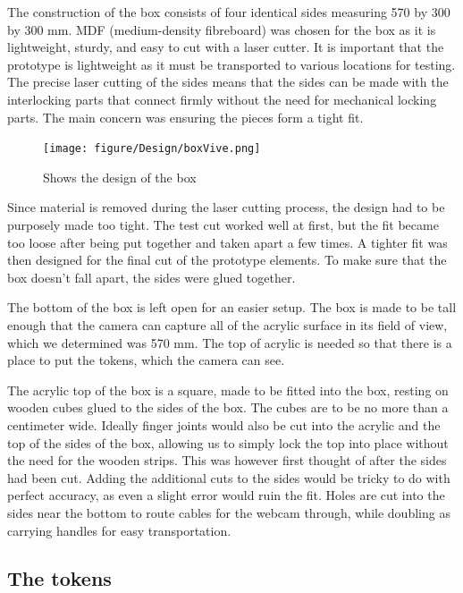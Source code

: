 The construction of the box consists of four identical sides measuring 570 by 300 by 300 mm. MDF (medium-density fibreboard) was chosen for the box as it is lightweight, sturdy, and easy to cut with a laser cutter. It is important that the prototype is lightweight as it must be transported to various locations for testing. The precise laser cutting of the sides means that the sides can be made with the interlocking parts that connect firmly without the need for mechanical locking parts. The main concern was ensuring the pieces form a tight fit.
\begin{figure}[H]
	\centering
	\texttt{[image: figure/Design/boxVive.png]}
	\caption{Shows the design of the box}
	\label{fig:boxVive}
\end{figure}
 Since material is removed during the laser cutting process, the design had to be purposely made too tight. The test cut worked well at first, but the fit became too loose after being put together and taken apart a few times. A tighter fit was then designed for the final cut of the prototype elements. To make sure that the box doesn't fall apart, the sides were glued together. 

The bottom of the box is left open for an easier setup.
The box is made to be tall enough that the camera can capture all of the acrylic surface in its field of view, which we determined was 570 mm.
The top of acrylic is needed so that there is a place to put the tokens, which the camera can see.

The acrylic top of the box is a square, made to be fitted into the box, resting on wooden cubes glued to the sides of the box. The cubes are to be no more than a centimeter wide. Ideally finger joints would also be cut into the acrylic and the top of the sides of the box, allowing us to simply lock the top into place without the need for the wooden strips. This was however first thought of after the sides had been cut. Adding the additional cuts to the sides would be tricky to do with perfect accuracy, as even a slight error would ruin the fit. 
Holes are cut into the sides near the bottom to route cables for the webcam through, while doubling as carrying handles for easy transportation. 

\subsection{The tokens}

